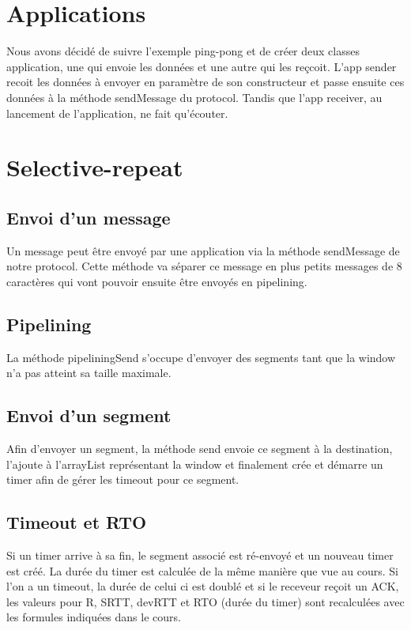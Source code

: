 \documentclass{article}
\begin{document}
\tableofcontents
\newpage


\section{Applications}

Nous avons décidé de suivre l'exemple ping-pong et de créer deux classes application, une qui envoie les données et une autre qui les reçcoit.
L'app sender recoit les données à envoyer en paramètre de son constructeur et passe ensuite ces données à la méthode sendMessage du protocol. 
Tandis que l'app receiver, au lancement de l'application, ne fait qu'écouter.

\section{Selective-repeat}

\subsection{Envoi d'un message}

Un message peut être envoyé par une application via la méthode sendMessage de notre protocol. Cette méthode va séparer ce message en plus petits messages de 8 caractères qui vont pouvoir ensuite être envoyés en pipelining.

\subsection{Pipelining}

La méthode pipeliningSend s'occupe d'envoyer des segments tant que la window n'a pas atteint sa taille maximale.

\subsection{Envoi d'un segment}

Afin d'envoyer un segment, la méthode send envoie ce segment à la destination, l'ajoute à l'arrayList représentant la window et finalement crée et démarre un timer afin de gérer les timeout pour ce segment.

\subsection{Timeout et RTO}

Si un timer arrive à sa fin, le segment associé est ré-envoyé et un nouveau timer est créé. La durée du timer est calculée de la même manière que vue au cours.
Si l'on a un timeout, la durée de celui ci est doublé et si le receveur reçoit un ACK, les valeurs pour R, SRTT, devRTT et RTO (durée du timer) sont recalculées avec les formules indiquées dans le cours.
\end{document}
